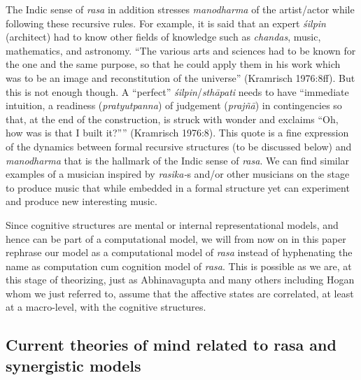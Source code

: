 The Indic sense of \textsl{rasa} in addition stresses \textsl{manodharma} of the artist/actor while following these recursive rules. For example, it is said that an expert \textsl{śilpin} (architect) had to know other fields of knowledge such as \textsl{chandas}, music, mathematics, and astronomy. “The various arts and sciences had to be known for the one and the same purpose, so that he could apply them in his work which was to be an image and reconstitution of the universe” (Kramrisch 1976:8ff). But this is not enough though. A “perfect” \textsl{śilpin}/\textsl{sthāpati} needs to have “immediate intuition, a readiness (\textsl{pratyutpanna}) of judgement (\textsl{prajñā}) in contingencies so that, at the end of the construction, is struck with wonder and exclaims “Oh, how was is that I built it?”” (Kramrisch 1976:8). This quote is a fine expression of the dynamics between formal recursive structures (to be discussed below) and \textsl{manodharma} that is the hallmark of the Indic sense of \textsl{rasa}. We can find similar examples of a musician inspired by \textsl{rasika-}s and/or other musicians on the stage to produce music that while embedded in a formal structure yet can experiment and produce new interesting music.

Since cognitive structures are mental or internal representational models, and hence can be part of a computational model, we will from now on in this paper rephrase our model as a computational model of \textsl{rasa} instead of hyphenating the name as computation cum cognition model of \textsl{rasa}. This is possible as we are, at this stage of theorizing, just as Abhinavagupta and many others including Hogan whom we just referred to, assume that the affective states are correlated, at least at a macro-level, with the cognitive structures.

\subsection{Current theories of mind related to rasa and synergistic models}\label{chap3-sec3.1}


